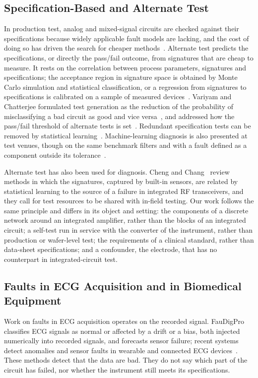 \subsection{Specification-Based and Alternate Test}
In production test, analog and mixed-signal circuits are checked against their specifications
because widely applicable fault models are lacking, and the cost of doing so has driven the
search for cheaper methods~\cite{cheng2010}. Alternate test predicts the specifications, or
directly the pass/fail outcome, from signatures that are cheap to measure. It rests on the
correlation between process parameters, signatures and specifications; the acceptance region in
signature space is obtained by Monte Carlo simulation and statistical classification, or a
regression from signatures to specifications is calibrated on a sample of measured
devices~\cite{cheng2010,voorakaranam2007}. Variyam and Chatterjee formulated test generation as
the reduction of the probability of misclassifying a bad circuit as good and vice
versa~\cite{variyam1998spec}, and addressed how the pass/fail threshold of alternate tests is
set~\cite{variyam1998synth}. Redundant specification tests can be removed by statistical
learning~\cite{biswas2005}. Machine-learning diagnosis is also presented at test venues, though on
the same benchmark filters and with a fault defined as a component outside its
tolerance~\cite{srimani2022}.

Alternate test has also been used for diagnosis. Cheng and Chang~\cite{cheng2010} review methods
in which the signatures, captured by built-in sensors, are related by statistical learning to the
source of a failure in integrated RF transceivers, and they call for test resources to be shared
with in-field testing. Our work follows the same principle and differs in its object and setting:
the components of a discrete network around an integrated amplifier, rather than the blocks of an
integrated circuit; a self-test run in service with the converter of the instrument, rather than
production or wafer-level test; the requirements of a clinical standard, rather than data-sheet
specifications; and a confounder, the electrode, that has no counterpart in integrated-circuit
test.

\subsection{Faults in ECG Acquisition and in Biomedical Equipment}
Work on faults in ECG acquisition operates on the recorded signal. FauDigPro~\cite{agarwal2022}
classifies ECG signals as normal or affected by a drift or a bias, both injected numerically into
recorded signals, and forecasts sensor failure; recent systems detect anomalies and sensor faults
in wearable and connected ECG devices~\cite{khezripour2026,adams2026}. These methods detect that
the data are bad. They do not say which part of the circuit has failed, nor whether the
instrument still meets its specifications.

